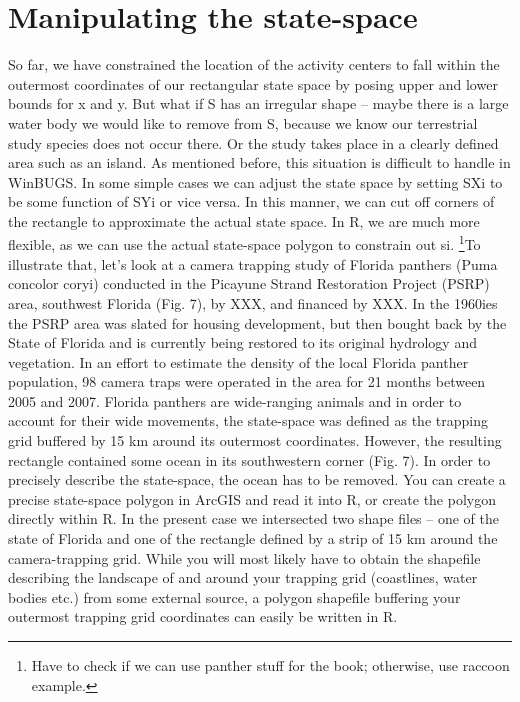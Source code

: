 \section{Manipulating the state-space}
So far, we have constrained the location of the activity centers to fall within the outermost coordinates of our rectangular state space by posing upper and lower bounds for x and y. But what if S has an irregular shape – maybe there is a large water body we would like to remove from S, because we know our terrestrial study species does not occur there. Or the study takes place in a clearly defined area such as an island. As mentioned before, this situation is difficult to handle in WinBUGS. In some simple cases we can adjust the state space by setting SXi to be some function of SYi or vice versa. In this manner, we can cut off corners of the rectangle to approximate the actual state space. In R, we are much more flexible, as we can use the actual state-space polygon to constrain out si. \footnote{ Have to check if we can use panther stuff for the book; otherwise, use raccoon example.}To illustrate that, let's look at a camera trapping study of Florida panthers (Puma concolor coryi) conducted in the Picayune Strand Restoration Project (PSRP) area, southwest Florida (Fig. 7), by XXX, and financed by XXX. In the 1960ies the PSRP area was slated for housing development, but then bought back by the State of Florida and is currently being restored to its original hydrology and vegetation. In an effort to estimate the density of the local Florida panther population, 98 camera traps were operated in the area for 21 months between 2005 and 2007. Florida panthers are wide-ranging animals and in order to account for their wide movements, the state-space was defined as the trapping grid buffered by 15 km around its outermost coordinates. However, the resulting rectangle contained some ocean in its southwestern corner (Fig. 7). 
In order to precisely describe the state-space, the ocean has to be removed. You can create a precise state-space polygon in ArcGIS and read it into R, or create the polygon directly within R. In the present case we intersected two shape files – one of the state of Florida and one of the rectangle defined by a strip of 15 km around the camera-trapping grid. 
While you will most likely have to obtain the shapefile describing the landscape of and around your trapping grid (coastlines, water bodies etc.) from some external source, a polygon shapefile buffering your outermost trapping grid coordinates can easily be written in R.

